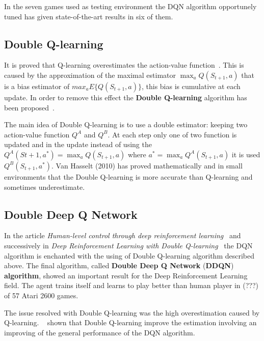 In the seven games used as testing environment the DQN algorithm opportunely tuned has given state-of-the-art results in six of them.




\subsection{Double Q-learning}
\label{subsec:DoubleQlearning}

It is proved that Q-learning overestimates the action-value function~\cite{NIPS2010_3964}. This is caused by the approximation of the maximal estimator $\max_a Q(S_{t+1}, a)$ that is a bias estimator of $max_a E \{ Q(S_{t+1}, a) \}$, this bias is cumulative at each update. In order to remove this effect the \textbf{Double Q-learning} algorithm has been proposed~\cite{NIPS2010_3964}.

The main idea of Double Q-learning is to use a double estimator: keeping two action-value function $Q^A$ and $Q^B$. At each step only one of two function is updated and in the update instead of using the $Q^A(S{t+1}, a^*) = \max_a Q(S_{t+1}, a)$ where $a^* = \max_a Q^A(S_{t+1}, a)$ it is used $Q^B(S_{t+1}, a^*)$.
Van Hasselt (2010) has proved mathematically and in small environments that the Double Q-learning is more accurate than Q-learning and sometimes underestimate.

\subsection{Double Deep Q Network}

In the article \textit{Human-level control through deep reinforcement learning}~\cite{Mnih2015} and successively in \textit{Deep Reinforcement Learning with Double Q-learning}~\cite{Hasselt:2016:DRL:3016100.3016191} the DQN algorithm is enchanted with the using of Double Q-learning algorithm described above. The final algorithm, called \textbf{Double Deep Q Network} (\textbf{DDQN}) \textbf{algorithm}, showed an important result for the Deep Reinforcement Learning field. The agent trains itself and learns to play better than human player in (???) of 57 Atari 2600 games.


The issue resolved with Double Q-learning was the high overestimation caused by Q-learning. \citeauthor{Hasselt:2016:DRL:3016100.3016191}~ shown that Double Q-learning improve the estimation involving an improving of the general performance of the DQN algorithm.


